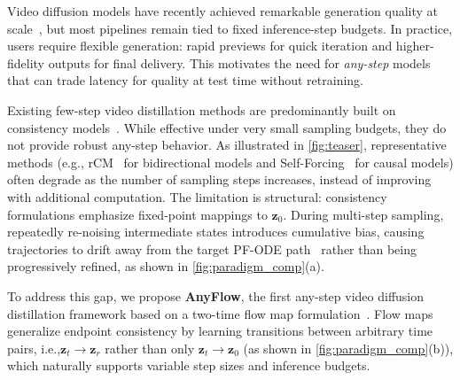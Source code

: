 \documentclass{llmxive}
\providecommand{\eg}{e.g.,\xspace}
\providecommand{\ie}{i.e.,\xspace}
\begin{document}
Video diffusion models have recently achieved remarkable generation quality at scale~\cite{wan2025wan,agarwal2025cosmos,kong2024hunyuanvideo,yang2024cogvideox,HaCohen2024LTXVideo}, but most pipelines remain tied to fixed inference-step budgets. In practice, users require flexible generation: rapid previews for quick iteration and higher-fidelity outputs for final delivery. This motivates the need for \emph{any-step} models that can trade latency for quality at test time without retraining.

Existing few-step video distillation methods are predominantly built on consistency models~\cite{song2023consistency,song2024improved,lu2024simplifying,zheng2025large,huang2025selfforcing}. While effective under very small sampling budgets, they do not provide robust any-step behavior. As illustrated in \cref{fig:teaser}, representative methods (\eg rCM~\cite{zheng2025large} for bidirectional models and Self-Forcing~\cite{huang2025selfforcing} for causal models) often degrade as the number of sampling steps increases, instead of improving with additional computation. The limitation is structural: consistency formulations emphasize fixed-point mappings to $\mathbf{z}_0$. During multi-step sampling, repeatedly re-noising intermediate states introduces cumulative bias, causing trajectories to drift away from the target PF-ODE path~\cite{sabour2025align} rather than being progressively refined, as shown in \cref{fig:paradigm_comp}(a).

To address this gap, we propose \textbf{AnyFlow}, the first any-step video diffusion distillation framework based on a two-time flow map formulation~\cite{boffi2024flow,sabour2025align,geng2025mean}. Flow maps generalize endpoint consistency by learning transitions between arbitrary time pairs, \ie $\mathbf{z}_t\!\to\!\mathbf{z}_r$ rather than only $\mathbf{z}_t\!\to\!\mathbf{z}_0$ (as shown in \cref{fig:paradigm_comp}(b)), which naturally supports variable step sizes and inference budgets.
\end{document}
